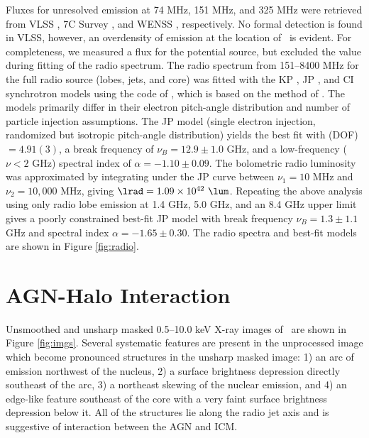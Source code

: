 \documentclass[useAMS,usenatbib]{mn2e}
\begin{document}
Fluxes for unresolved emission at 74 MHz, 151 MHz, and 325 MHz were
retrieved from VLSS \citep{vlss}, 7C Survey
\citep{1999MNRAS.306...31R}, and WENSS \citep{1997A&AS..124..259R},
respectively. No formal detection is found in VLSS, however, an
overdensity of emission at the location of \irs\ is evident. For
completeness, we measured a flux for the potential source, but
excluded the value during fitting of the radio spectrum. The radio
spectrum from 151--8400 MHz for the full radio source (lobes, jets,
and core) was fitted with the KP \citep{1962SvA.....6..317K, pach}, JP
\citep{1973A&A....26..423J}, and CI \citep{1987MNRAS.225..335H}
synchrotron models using the code of \citet{2005ApJ...624..656W},
which is based on the method of \citet{1991ApJ...383..554C}. The
models primarily differ in their electron pitch-angle distribution and
number of particle injection assumptions. The JP model (single
electron injection, randomized but isotropic pitch-angle distribution)
yields the best fit with \chisq(DOF)$ = 4.91(3)$, a break frequency of
$\nu_B = 12.9 \pm 1.0$ GHz, and a low-frequency ($\nu < 2$ GHz)
spectral index of $\alpha = -1.10 \pm 0.09$. The bolometric radio
luminosity was approximated by integrating under the JP curve between
$\nu_1 = 10$ MHz and $\nu_2 = 10,000$ MHz, giving $\lrad = 1.09 \times
10^{42}~\lum$. Repeating the above analysis using only radio lobe
emission at 1.4 GHz, 5.0 GHz, and an 8.4 GHz upper limit gives a
poorly constrained best-fit JP model with break frequency $\nu_B = 1.3
\pm 1.1$ GHz and spectral index $\alpha = -1.65 \pm 0.30$. The radio
spectra and best-fit models are shown in Figure \ref{fig:radio}.

\section{AGN-Halo Interaction}
\label{sec:sub}

Unsmoothed and unsharp masked 0.5--10.0 keV X-ray images of \irs\ are
shown in Figure \ref{fig:imgs}. Several systematic features are
present in the unprocessed image which become pronounced structures in
the unsharp masked image: 1) an arc of emission northwest of the
nucleus, 2) a surface brightness depression directly southeast of the
arc, 3) a northeast skewing of the nuclear emission, and 4) an
edge-like feature southeast of the core with a very faint surface
brightness depression below it. All of the structures lie along the
radio jet axis and is suggestive of interaction between the AGN and
ICM.
\end{document}
